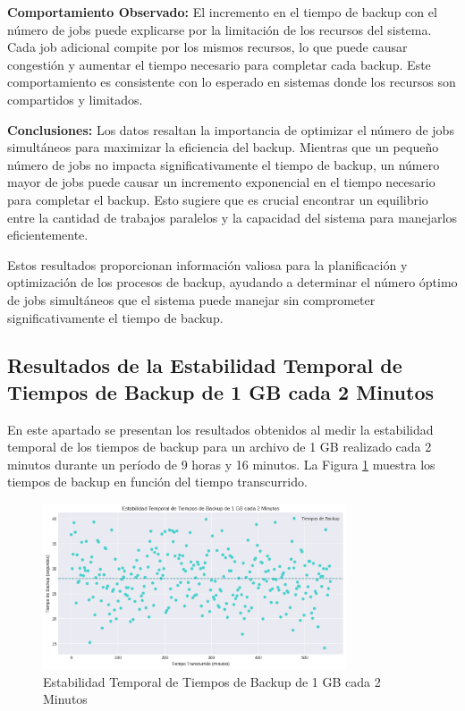 \textbf{Comportamiento Observado:}
El incremento en el tiempo de backup con el número de jobs puede explicarse por la limitación de los recursos del sistema. Cada job adicional compite por los mismos recursos, lo que puede causar congestión y aumentar el tiempo necesario para completar cada backup. Este comportamiento es consistente con lo esperado en sistemas donde los recursos son compartidos y limitados.

\textbf{Conclusiones:}
Los datos resaltan la importancia de optimizar el número de jobs simultáneos para maximizar la eficiencia del backup. Mientras que un pequeño número de jobs no impacta significativamente el tiempo de backup, un número mayor de jobs puede causar un incremento exponencial en el tiempo necesario para completar el backup. Esto sugiere que es crucial encontrar un equilibrio entre la cantidad de trabajos paralelos y la capacidad del sistema para manejarlos eficientemente.

Estos resultados proporcionan información valiosa para la planificación y optimización de los procesos de backup, ayudando a determinar el número óptimo de jobs simultáneos que el sistema puede manejar sin comprometer significativamente el tiempo de backup.






\subsection{Resultados de la Estabilidad Temporal de Tiempos de Backup de 1 GB cada 2 Minutos}

En este apartado se presentan los resultados obtenidos al medir la estabilidad temporal de los tiempos de backup para un archivo de 1 GB realizado cada 2 minutos durante un período de 9 horas y 16 minutos. La Figura \ref{fig:estabilidad-temporal} muestra los tiempos de backup en función del tiempo transcurrido.

\begin{figure}[H]
    \centering
    \includegraphics[width=0.8\textwidth]{estabilidad_temporal.png}
    \caption{Estabilidad Temporal de Tiempos de Backup de 1 GB cada 2 Minutos}
    \label{fig:estabilidad-temporal}
\end{figure}

